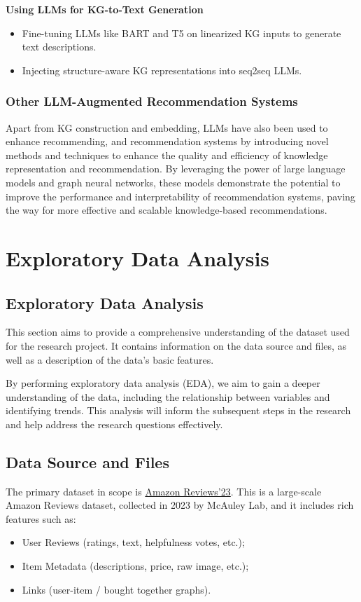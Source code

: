 \documentclass{article}
\begin{document}
\textbf{Using LLMs for KG-to-Text Generation}
\begin{itemize}
      \item Fine-tuning LLMs like BART and T5 on linearized KG inputs to
            generate
            text descriptions.
      \item Injecting structure-aware KG representations into seq2seq LLMs.
\end{itemize}

\subsubsection{Other LLM-Augmented Recommendation Systems}
Apart from KG construction and embedding, LLMs have also been used to enhance
recommending, and recommendation systems by introducing novel methods and
techniques to enhance the quality and efficiency of knowledge representation
and recommendation. By leveraging the power of large language models and graph
neural networks, these models demonstrate the potential to improve the
performance and interpretability of recommendation systems, paving the way for
more effective and scalable knowledge-based recommendations.

\section{Exploratory Data Analysis}

\subsection{Exploratory Data Analysis}

This section aims to provide a comprehensive understanding of the dataset used
for the research project. It contains information on the data source and files,
as well as a description of the data's basic features.

By performing exploratory data analysis (EDA), we aim to gain a deeper
understanding of the data, including the relationship between variables and
identifying trends. This analysis will inform the subsequent steps in the
research and help address the research questions effectively.

\subsection{Data Source and Files}

The primary dataset in scope is
\href{https://amazon-reviews-2023.github.io/index.html}{Amazon Reviews'23}.
This is a large-scale Amazon Reviews dataset, collected in 2023 by McAuley Lab,
and it includes rich features such as:
\begin {itemize}
\item User Reviews (ratings, text, helpfulness votes, etc.);
\item Item Metadata (descriptions, price, raw image, etc.);
\item Links (user-item / bought together graphs).
\end {itemize}
\end{document}
